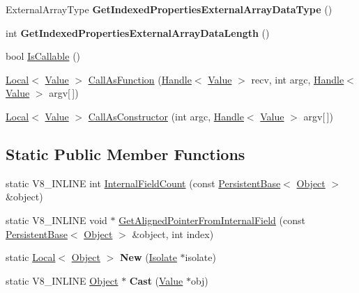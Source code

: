 \begin{DoxyCompactItemize}
\item 
\hypertarget{classv8_1_1Object_a02e0652188d3a9c557b07ac2ba037b23}{External\-Array\-Type {\bfseries Get\-Indexed\-Properties\-External\-Array\-Data\-Type} ()}\label{classv8_1_1Object_a02e0652188d3a9c557b07ac2ba037b23}

\item 
\hypertarget{classv8_1_1Object_a9aa725628f4d3371999663e6611efeb3}{int {\bfseries Get\-Indexed\-Properties\-External\-Array\-Data\-Length} ()}\label{classv8_1_1Object_a9aa725628f4d3371999663e6611efeb3}

\item 
bool \hyperlink{classv8_1_1Object_a23c2c1f23b50fab4a02e2f819641b865}{Is\-Callable} ()
\item 
\hyperlink{classv8_1_1Local}{Local}$<$ \hyperlink{classv8_1_1Value}{Value} $>$ \hyperlink{classv8_1_1Object_ac8dea845a715de7ad43fcb073dc8c3d9}{Call\-As\-Function} (\hyperlink{classv8_1_1Handle}{Handle}$<$ \hyperlink{classv8_1_1Value}{Value} $>$ recv, int argc, \hyperlink{classv8_1_1Handle}{Handle}$<$ \hyperlink{classv8_1_1Value}{Value} $>$ argv\mbox{[}$\,$\mbox{]})
\item 
\hyperlink{classv8_1_1Local}{Local}$<$ \hyperlink{classv8_1_1Value}{Value} $>$ \hyperlink{classv8_1_1Object_afeb999e9225dad0ca8605ed3015b268b}{Call\-As\-Constructor} (int argc, \hyperlink{classv8_1_1Handle}{Handle}$<$ \hyperlink{classv8_1_1Value}{Value} $>$ argv\mbox{[}$\,$\mbox{]})
\end{DoxyCompactItemize}
\subsection*{Static Public Member Functions}
\begin{DoxyCompactItemize}
\item 
static V8\-\_\-\-I\-N\-L\-I\-N\-E int \hyperlink{classv8_1_1Object_a324a71142f621a32bfe5738648718370}{Internal\-Field\-Count} (const \hyperlink{classv8_1_1PersistentBase}{Persistent\-Base}$<$ \hyperlink{classv8_1_1Object}{Object} $>$ \&object)
\item 
static V8\-\_\-\-I\-N\-L\-I\-N\-E void $\ast$ \hyperlink{classv8_1_1Object_a65b5a3dc93c0774594f8b0f2ab5481c8}{Get\-Aligned\-Pointer\-From\-Internal\-Field} (const \hyperlink{classv8_1_1PersistentBase}{Persistent\-Base}$<$ \hyperlink{classv8_1_1Object}{Object} $>$ \&object, int index)
\item 
\hypertarget{classv8_1_1Object_a0c397b055e2f5050c6ffc33970669c4d}{static \hyperlink{classv8_1_1Local}{Local}$<$ \hyperlink{classv8_1_1Object}{Object} $>$ {\bfseries New} (\hyperlink{classv8_1_1Isolate}{Isolate} $\ast$isolate)}\label{classv8_1_1Object_a0c397b055e2f5050c6ffc33970669c4d}

\item 
\hypertarget{classv8_1_1Object_a1f9ac46d0b164197318ce81dc0ec1343}{static V8\-\_\-\-I\-N\-L\-I\-N\-E \hyperlink{classv8_1_1Object}{Object} $\ast$ {\bfseries Cast} (\hyperlink{classv8_1_1Value}{Value} $\ast$obj)}\label{classv8_1_1Object_a1f9ac46d0b164197318ce81dc0ec1343}

\end{DoxyCompactItemize}


